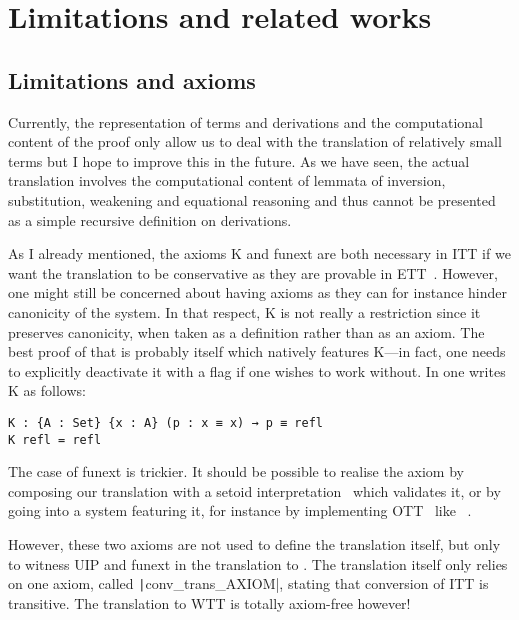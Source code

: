 \chapter{Limitations and related works}

\section{Limitations and axioms}
\label{sec:axioms}

Currently, the representation of terms and derivations and the
computational content of the proof only allow us to deal with the
translation of relatively small terms but I hope to improve this in
the future. As we have seen, the actual translation involves the
computational content of lemmata of inversion, substitution, weakening
and equational reasoning and thus cannot be presented as a simple
recursive definition on derivations.


As I already mentioned, the axioms K and \acrshort{funext} are both
necessary in \acrshort{ITT} if we want the translation to be conservative as
they are provable in \acrshort{ETT}~.
However, one might still be concerned about having axioms
as they can for instance hinder canonicity of the system.
In that respect, K is not really a restriction since it preserves canonicity,
when taken as a definition rather than as an axiom.
The best proof of that is probably \Agda itself which natively features K---in
fact, one needs to explicitly deactivate it with a flag if one wishes to work
without. In \Agda one writes K as follows:
\begin{verbatim}
K : {A : Set} {x : A} (p : x ≡ x) → p ≡ refl
K refl = refl
\end{verbatim}

The case of \acrshort{funext} is trickier. It should be possible to realise
the axiom by composing our translation with a setoid
interpretation~ which validates it, or by going into a
system featuring it, for instance by implementing
\acrlong{OTT}~ like
\Epigram~.

However, these two axioms are not used to define the translation itself,
but only to witness \acrshort{UIP} and \acrlong{funext} in the translation to
\Coq.
The translation itself only relies on one axiom, called
\texttt|conv_trans_AXIOM|, stating that conversion
of \acrshort{ITT} is transitive.
The translation to \acrshort{WTT} is totally axiom-free however!

